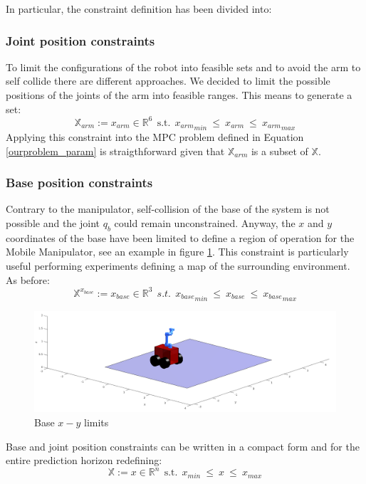 In particular, the constraint definition has been divided into: 

\subsubsection*{Joint position constraints}
	To limit the configurations of the robot into feasible sets and to avoid the arm to self collide there are different approaches. We decided to limit the possible positions of the joints of the arm into feasible ranges. This means to generate a set:
	\begin{equation}
		\mathbb{X}_{arm}:=x_{arm} \in \mathbb{R}^{6}\ \ \text{s.t.}\ \  {x_{arm}}_{min}\ \leq\ x_{arm}\ \leq\ {x_{arm}}_{max} 
	\end{equation}
	Applying this constraint into the MPC problem defined in Equation \ref{ourproblem_param} is straigthforward given that $\mathbb{X}_{arm}$ is a subset of $\mathbb{X}$.
\subsubsection*{Base position constraints}
	Contrary to the manipulator, self-collision of the base of the system is not possible and the joint $q_b$ could remain unconstrained. Anyway, the $x$ and $y$ coordinates of the base have been limited to define a region of operation for the Mobile Manipulator, see an example in figure \ref{xy_limits}. This constraint is particularly useful performing experiments defining a map of the surrounding environment. As before: 
	\begin{equation}
		\mathbb{X}^{x_{base}}:=x_{base} \in \mathbb{R}^3\ \ s.t.\ \  {x_{base}}_{min}\ \leq\ x_{base}\ \leq\ {x_{base}}_{max} 
	\end{equation}

	\begin{figure}[h!]
	\centering
	\includegraphics[scale=0.25]{IMMAGINI/xy_limits.png}
	\caption{Base $x-y$ limits}
	\label{xy_limits}
	\end{figure}

	Base and joint position constraints can be written in a compact form and for the entire prediction horizon redefining: 
	\begin{equation}
	\mathbb{X}:= x \in \mathbb{R}^{n}\ \ \text{s.t.}\ \  {x}_{min}\ \leq\ x\ \leq\ {x}_{max}
	\end{equation}

